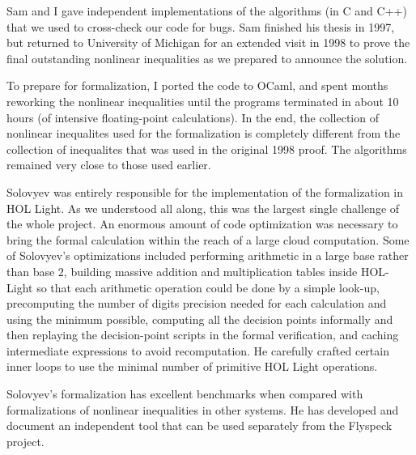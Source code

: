 \documentclass{amsart}
\begin{document}
Sam and I gave independent implementations of the algorithms (in C and
C++) that we used to cross-check our code for bugs. Sam finished his
thesis in 1997, but returned to University of Michigan for an
extended visit in 1998 to prove the final outstanding nonlinear
inequalities as we prepared to announce the solution.

To prepare for formalization, I ported the code to OCaml, and spent
months reworking the nonlinear inequalities until the programs
terminated in about 10 hours (of intensive floating-point
calculations).  In the end, the collection of nonlinear inequalites
used for the formalization is completely different from the collection
of inequalites that was used in the original 1998 proof.
The algorithms remained very close to those used earlier.

Solovyev was entirely responsible for the implementation of the
formalization in HOL Light.  As we understood all along, this was the
largest single challenge of the whole project.  An enormous amount of
code optimization was necessary to bring the formal calculation within
the reach of a large cloud computation.  Some of Solovyev's
optimizations included performing arithmetic in a large base rather
than base $2$, building massive addition and multiplication tables
inside HOL-Light so that each arithmetic operation could be done by a
simple look-up, precomputing the number of digits precision needed for
each calculation and using the minimum possible, computing all the
decision points informally and then replaying the decision-point
scripts in the formal verification, and caching intermediate
expressions to avoid recomputation.  He carefully crafted certain
inner loops to use the minimal number of primitive HOL Light
operations.

Solovyev's formalization has excellent benchmarks
when compared with formalizations of nonlinear inequalities in
other systems.  He has developed and document an independent tool
that can be used separately from the Flyspeck project.
\end{document}
